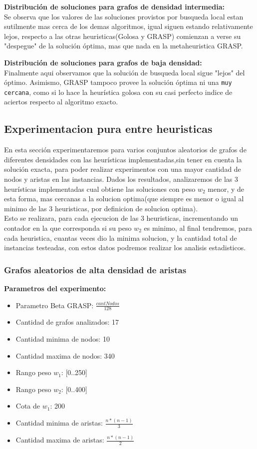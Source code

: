 \vspace{0.5cm}
\textbf{Distribuci\'on de soluciones para grafos de densidad intermedia:}\\
Se observa que los valores de las soluciones provistos por busqueda local estan sutilmente mas cerca de los demas algoritmos, igual siguen estando relativamente lejos, respecto a las otras heuristicas(Golosa y GRASP) comienzan a verse su "despegue" de la soluci\'on \'optima, mas que nada en la metaheuristica GRASP.

\vspace{0.5cm}
\textbf{Distribuci\'on de soluciones para grafos de baja densidad:}\\
Finalmente aqui observamos que la soluci\'on de busqueda local sigue "lejos" del \'optimo. Asimismo, GRASP tampoco provee la soluci\'on \'optima ni una \texttt{muy cercana}, como si lo hace la heur\'istica golosa con su casi perfecto indice de aciertos respecto al algoritmo exacto.

\subsection{Experimentacion pura entre heuristicas}
En esta secci\'on experimentaremos para varios conjuntos aleatorios de grafos de diferentes densidades con las heur\'isticas implementadas,sin tener en cuenta la soluci\'on exacta, para poder realizar experimentos con una mayor cantidad de nodos y aristas en las instancias. Dados los resultados, analizaremos de las 3 heur\'isticas implementadas cual obtiene las soluciones con peso $w_2$ menor, y de esta forma, mas cercanas a la solucion optima(que siempre es menor o igual al minimo de las 3 heuristicas, por definicion de solucion optima).\\

Esto se realizara, para cada ejecucion de las 3 heuristicas, incrementando un contador en la que corresponda si su peso $w_2$ es minimo, al final tendremos, para cada heuristica, cuantas veces dio la minima solucion, y la cantidad total de instancias testeadas, con estos datos podremos realizar los analisis estadisticos.

\subsubsection{Grafos aleatorios de alta densidad de aristas}
\textbf{Parametros del experimento:}
\begin{itemize}
	\item Parametro Beta GRASP: $\frac{cantNodos}{128}$
	\item Cantidad de grafos analizados: 17
	\item Cantidad minima de nodos: 10
	\item Cantidad maxima de nodos: 340
	\item Rango peso $w_1$: [0..250]
	\item Rango peso $w_2$: [0..400]
	\item Cota de $w_1$: 200
	\item Cantidad minima de aristas: $\frac{n * (n-1)}{3}$
	\item Cantidad maxima de aristas: $\frac{n * (n-1)}{2}$
\end{itemize}

